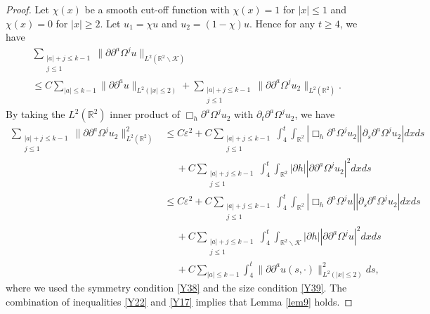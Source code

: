 \documentclass[11pt, reqno]{amsart}
\theoremstyle{definition}
\theoremstyle{remark}
\theoremstyle{definition}
\numberwithin{equation}{section}
\numberwithin{equation}{section}
\def\leq{\leqslant}
\def\geq{\geqslant}
\begin{document}
\begin{proof}
Let $\chi(x)$ be a smooth cut-off function with $\chi(x)=1$ for
$|x|\leq1$ and $\chi(x)=0$ for $|x|\geq2$. Let $u_1=\chi u$ and
$u_2=(1-\chi)u$. Hence for any $t\geq4$, we have
\begin{align}\label{Y22}
&\sum_{\substack{|a|+j\leq
k-1\\j\leq1}}\|\partial\partial^a\Omega^ju\|_{L^2(\mathbb
R^2\backslash\mathcal {K})}\nonumber\\&\leq C\sum_{|a|\leq
k-1}\|\partial\partial^au\|_{L^2(|x|\leq
2)}+\sum_{\substack{|a|+j\leq
k-1\\j\leq1}}\|\partial\partial^a\Omega^ju_2\|_{L^2(\mathbb R^2)}.
\end{align}
By taking the $L^2(\mathbb R^2)$ inner product of
$\Box_h\partial^a\Omega^j u_2$ with
$\partial_t\partial^a\Omega^ju_2$, we have
\begin{align}\label{Y17}
\sum_{\substack{|a|+j\leq
k-1\\j\leq1}}\|\partial\partial^a\Omega^ju_2\|^2_{L^2(\mathbb R^2)}
&\leq C\varepsilon^2+C\sum_{\substack{|a|+j\leq
k-1\\j\leq1}}\int_4^t\int_{\mathbb R^2}|\Box_h\partial^a\Omega^j
u_2||\partial_s\partial^a\Omega^ju_2|dxds \nonumber\\&\quad\
+C\sum_{\substack{|a|+j\leq k-1\\j\leq1}}\int_4^t\int_{\mathbb
R^2}|\partial h||\partial\partial^a\Omega^ju_2|^2dxds
\nonumber\\&\leq C\varepsilon^2+C\sum_{\substack{|a|+j\leq
k-1\\j\leq1}}\int_4^t\int_{\mathbb R^2}|\Box_h\partial^a\Omega^j
u||\partial_s\partial^a\Omega^ju_2|dxds\nonumber\\&\quad\
+C\sum_{\substack{|a|+j\leq k-1\\j\leq1}}\int_4^t\int_{\mathbb
R^2\backslash\mathcal {K}}|\partial
h||\partial\partial^a\Omega^ju|^2dxds \nonumber\\&\quad\
+C\sum_{|a|\leq
k-1}\int_4^t\|\partial\partial^au(s,\cdot)\|^2_{L^2(|x|\leq2)}ds,
\end{align}
where we used the symmetry condition \eqref{Y38} and the size
condition \eqref{Y39}. The combination of inequalities \eqref{Y22}
and \eqref{Y17} implies that Lemma \ref{lem9} holds.
\end{proof}
\end{document}
